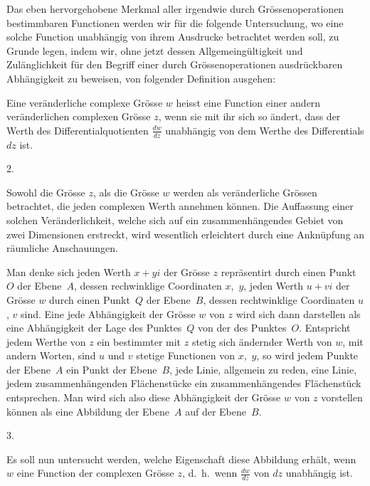 \documentclass[a4paper,12pt]{article}
\begin{document}
Das eben hervorgehobene Merkmal aller irgendwie durch
Gr\"{o}ssenoperationen bestimmbaren Functionen werden wir f\"{u}r
die folgende Untersuchung, wo eine solche Function unabh\"{a}ngig
von ihrem Ausdrucke betrachtet werden soll, zu Grunde legen,
indem wir, ohne jetzt dessen Allgemeing\"{u}ltigkeit und
Zul\"{a}nglichkeit f\"{u}r den Begriff einer durch
Gr\"{o}ssenoperationen ausdr\"{u}ckbaren Abh\"{a}ngigkeit zu
beweisen, von folgender Definition ausgehen:

Eine ver\"{a}nderliche complexe Gr\"{o}sse $w$ heisst eine
Function einer andern ver\"{a}nderlichen complexen Gr\"{o}sse
$z$, wenn sie mit ihr sich so \"{a}ndert, dass der Werth des
Differentialquotienten
$\displaystyle \frac{dw}{dz}$
unabh\"{a}ngig von dem Werthe des Differentials $dz$ ist.

\medbreak

\centerline{2.}

\nobreak\medskip

Sowohl die Gr\"{o}sse $z$, als die Gr\"{o}sse $w$ werden als
ver\"{a}nderliche Gr\"{o}ssen betrachtet, die jeden complexen
Werth annehmen k\"{o}nnen.  Die Auffassung einer solchen
Ver\"{a}nderlichkeit, welche sich auf ein zusammenh\"{a}ngendes
Gebiet von zwei Dimensionen erstreckt, wird wesentlich
erleichtert durch eine Ankn\"{u}pfung an r\"{a}umliche
Anschauungen.

Man denke sich jeden Werth $x + yi$ der Gr\"{o}sse $z$
repr\"{a}sentirt durch einen Punkt~$O$ der Ebene~$A$, dessen
rechwinklige Coordinaten $x$,~$y$, jeden Werth $u + vi$ der
Gr\"{o}sse $w$ durch einen Punkt~$Q$ der Ebene~$B$, dessen
rechtwinklige Coordinaten $u$, $v$ sind.  Eine jede
Abh\"{a}ngigkeit der Gr\"{o}sse $w$ von $z$ wird sich dann
darstellen als eine Abh\"{a}ngigkeit der Lage des Punktes~$Q$ von
der des Punktes~$O$.  Entspricht jedem Werthe von $z$ ein
bestimmter mit $z$ stetig sich \"{a}ndernder Werth von $w$, mit
andern Worten, sind $u$ und $v$ stetige Functionen von $x$,~$y$,
so wird jedem Punkte der Ebene~$A$ ein Punkt der Ebene~$B$, jede
Linie, allgemein zu reden, eine Linie, jedem
zusammenh\"{a}ngenden Fl\"{a}chenst\"{u}cke ein
zusammenh\"{a}ngendes Fl\"{a}chenst\"{u}ck entsprechen.  Man wird
sich also diese Abh\"{a}ngigkeit der Gr\"{o}sse $w$ von $z$
vorstellen k\"{o}nnen als eine Abbildung der Ebene~$A$ auf der
Ebene~$B$.

\medbreak

\centerline{3.}

\nobreak\medskip

Es soll nun untersucht werden, welche Eigenschaft diese Abbildung
erh\"{a}lt, wenn $w$ eine Function der complexen Gr\"{o}sse $z$,
d.~h.\ wenn
$\displaystyle \frac{dw}{dz}$
von $dz$ unabh\"{a}ngig ist.
\end{document}
